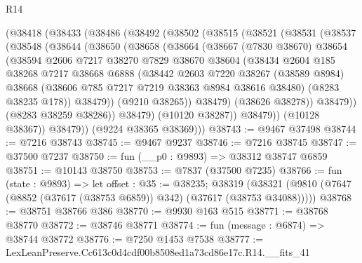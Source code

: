 \begin{lexlean}{R14}
\begin{coremodule}
    (@38418
      (@38433
        (@38486
          (@38492
            (@38502
              (@38515
                (@38521
                  (@38531
                    (@38537
                      (@38548
                        (@38644
                          (@38650
                            (@38658
                              (@38664
                                (@38667
                                  (@7830 @38670)
                                  @38654
                                  (@38594
                                    @2606
                                    @7217
                                    @38270
                                    @7829
                                    @38670
                                    @38604
                                    (@38434
                                      @2604
                                      @185
                                      @38268
                                      @7217
                                      @38668
                                      @6888
                                      (@38442
                                        @2603
                                        @7220
                                        @38267
                                        (@38589 @8984)
                                        @38668
                                        (@38606 @785 @7217 @7219 @38363 @8984 @38616 @38480)
                                        (@8283 @38235 @178))
                                      @38479))
                                  (@9210 @38265))
                                @38479)
                              (@38626 @38278))
                            @38479))
                        (@8283 @38259 @38286))
                      @38479)
                    (@10120 @38287))
                  @38479))
              (@10128 @38367))
            @38479))
        (@9224 @38365 @38369)))
@38743 := @9467 @37498
@38744 := @7216 @38743
@38745 := @9467 @9237
@38746 := @7216 @38745
@38747 := @37500 @7237
@38750 := fun (__p0 : @9893) => @38312 @38747 @6859
@38751 := @10143 @38750
@38753 := @7837 (@37500 @7235)
@38766 := fun (state : @9893) =>
  let offset : @35 := @38235;
  @38319 (@38321 (@9810 (@7647 (@8852 (@37617 (@38753 @6859)) @342) (@37617 (@38753 @34088)))))
@38768 := @38751 @38766 @386
@38770 := @9930 @163 @515
@38771 := @38768 @38770
@38772 := @38746 @38771
@38774 := fun (message : @6874) => @38744 @38772
@38776 := @7250 @1453 @7538
@38777 := LexLeanPreserve.Cc613c0d4cdf00b8508ed1a73cd86e17c.R14.__fits_41

\end{coremodule}
\end{lexlean}
